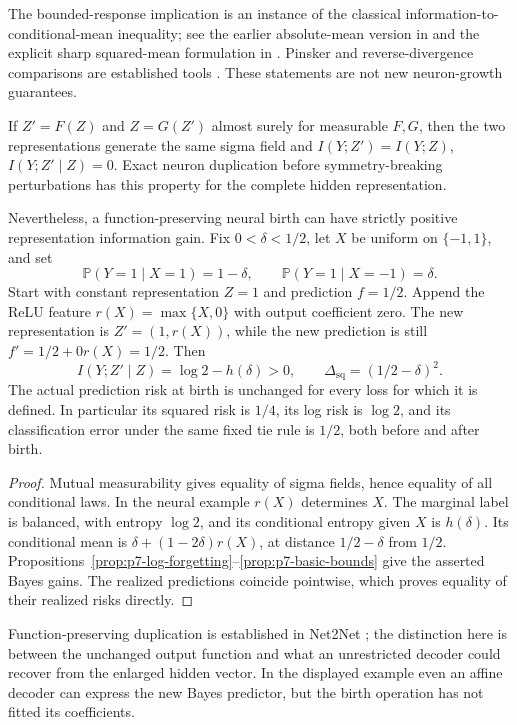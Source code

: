 The bounded-response implication is an instance of the classical
information-to-conditional-mean inequality; see the earlier absolute-mean
version in \cite[Lemma 4.4]{p7tao2006} and the explicit sharp squared-mean formulation in
\cite[Corollary 7.11]{p7polyanskiy2024}. Pinsker and reverse-divergence
comparisons are established tools \cite[Eq.~(1), Section VI]{p7sason2016}.
These statements are not new neuron-growth guarantees.

\begin{proposition}
\label{prop:p7-birth}
If $Z'=F(Z)$ and $Z=G(Z')$ almost surely for measurable $F,G$, then
the two representations generate the same sigma field and
$I(Y;Z')=I(Y;Z)$, $I(Y;Z'\mid Z)=0$.
Exact neuron duplication before symmetry-breaking perturbations has
this property for the complete hidden representation.

Nevertheless, a function-preserving neural birth can have strictly
positive representation information gain. Fix $0<\delta<1/2$,
let $X$ be uniform on $\{-1,1\}$, and set
\[
 \mathbb P(Y=1\mid X=1)=1-\delta,\qquad
 \mathbb P(Y=1\mid X=-1)=\delta.
\]
Start with constant representation $Z=1$ and prediction $f=1/2$.
Append the ReLU feature $r(X)=\max\{X,0\}$ with output coefficient
zero. The new representation is $Z'=(1,r(X))$, while the new prediction
is still $f'=1/2+0r(X)=1/2$. Then
\[
 I(Y;Z'\mid Z)=\log2-h(\delta)>0,
 \qquad \Delta_{\mathrm{sq}}=(1/2-\delta)^2.
\]
The actual prediction risk at birth is unchanged for every loss for
which it is defined. In particular its squared risk is $1/4$, its log
risk is $\log2$, and its classification error under the same fixed
tie rule is $1/2$, both before and after birth.
\end{proposition}
\begin{proof}
Mutual measurability gives equality of sigma fields, hence equality of
all conditional laws. In the neural example $r(X)$ determines $X$.
The marginal label is balanced, with entropy $\log2$, and its
conditional entropy given $X$ is $h(\delta)$. Its conditional mean is
$\delta+(1-2\delta)r(X)$, at distance $1/2-\delta$ from $1/2$.
Propositions~\ref{prop:p7-log-forgetting}--\ref{prop:p7-basic-bounds}
give the asserted Bayes gains. The realized predictions coincide
pointwise, which proves equality of their realized risks directly.
\end{proof}

Function-preserving duplication is established in Net2Net
\cite[Section 2.3]{p7chen2016}; the distinction here is between the
unchanged output function and what an unrestricted decoder could recover
from the enlarged hidden vector. In the displayed example even an affine
decoder can express the new Bayes predictor, but the birth operation has
not fitted its coefficients.

